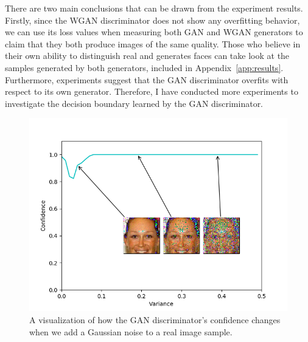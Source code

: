 There are two main conclusions that can be drawn from the experiment results. Firstly, since the WGAN discriminator does not show any overfitting behavior, we can use its loss values when measuring both GAN and WGAN generators to claim that they both produce images of the same quality. Those who believe in their own ability to distinguish real and generates faces can take look at the samples generated by both generators, included in Appendix~\ref{app:results}. Furthermore, experiments suggest that the GAN discriminator overfits with respect to its own generator. Therefore, I have conducted more experiments to investigate the decision boundary learned by the GAN discriminator.

\begin{figure}[h!]
	\includegraphics[width=\textwidth]{figures/diversity_gan2_real_dis_real_images}
	\caption{A visualization of how the GAN discriminator's confidence changes when we add a Gaussian noise to a real image sample.}
	\label{fig:changed_real_image_real_dis}
\end{figure}


